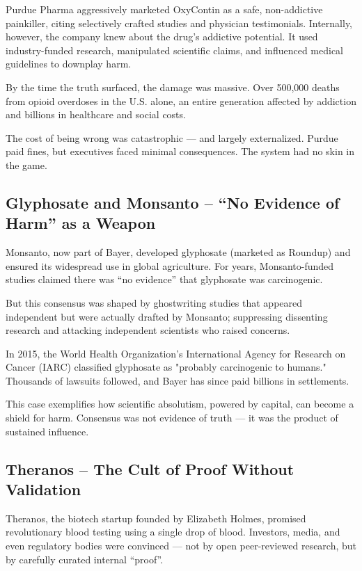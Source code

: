 \documentclass{article}
\begin{document}
Purdue Pharma aggressively marketed OxyContin as a safe, non-addictive painkiller, citing selectively crafted studies and physician testimonials. Internally, however, the company knew about the drug's addictive potential. It used industry-funded research, manipulated scientific claims, and influenced medical guidelines to downplay harm.

By the time the truth surfaced, the damage was massive. Over 500,000 deaths from opioid overdoses in the U.S. alone, an entire generation affected by addiction and billions in healthcare and social costs.

The cost of being wrong was catastrophic — and largely externalized. Purdue paid fines, but executives faced minimal consequences. The system had no skin in the game.

\cite{CBSnewsPurduePharma}
\cite{PBSPurduePharma}
\cite{Alonso2021}

\subsection{Glyphosate and Monsanto – “No Evidence of Harm” as a Weapon}

Monsanto, now part of Bayer, developed glyphosate (marketed as Roundup) and ensured its widespread use in global agriculture. For years, Monsanto-funded studies claimed there was “no evidence” that glyphosate was carcinogenic.

But this consensus was shaped by ghostwriting studies that appeared independent but were actually drafted by Monsanto; suppressing dissenting research and attacking independent scientists who raised concerns.

In 2015, the World Health Organization’s International Agency for Research on Cancer (IARC) classified glyphosate as "probably carcinogenic to humans." Thousands of lawsuits followed, and Bayer has since 
paid billions in settlements.

This case exemplifies how scientific absolutism, powered by capital, can become a shield for harm. Consensus was not evidence of truth — it was the product of sustained influence.

\cite{GLENNA2021104290}
\cite{mindthegap2020}
\cite{ehn2018}

\subsection{Theranos – The Cult of Proof Without Validation}

Theranos, the biotech startup founded by Elizabeth Holmes, promised revolutionary blood testing using a
single drop of blood. Investors, media, and even regulatory bodies were convinced — not by open
peer-reviewed research, but by carefully curated internal “proof”.
\end{document}

